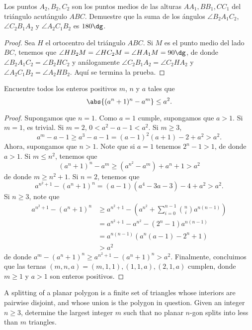 \begin{probEG}
	Los puntos $A_2,B_2,C_2$ son los puntos medios de las alturas $AA_1,BB_1,CC_1$ del triángulo acutángulo $ABC$. Demuestre que la suma de los ángulos $\angle B_2A_1C_2$, $\angle C_2B_1A_2$ y $\angle A_2C_1B_2$ es $180\dg$.
\end{probEG}

\begin{proof}
	Sea $H$ el ortocentro del triángulo $ABC$. Si $M$ es el punto medio del lado $BC$, tenemos que $\angle HB_2M=\angle HC_2M=\angle HA_1M=90\dg$, de donde $\angle B_2A_1C_2=\angle B_2HC_2$ y análogamente $\angle C_2B_1A_2=\angle C_2HA_2$ y $\angle A_2C_1B_2=\angle A_2HB_2$. Aquí se termina la prueba.
\end{proof}

\begin{probMB}
	Encuentre todos los enteros positivos $m$, $n$ y $a$ tales que
	\[\abs{(a^n+1)^n-a^m}\le a^2.\]
\end{probMB}

\begin{proof}
	Supongamos que $n=1$. Como $a=1$ cumple, supongamos que $a>1$. Si $m=1$, es trivial. Si $m=2$, $0<a^2-a-1<a^2$. Si $m\ge 3$,
	\[a^m-a-1\ge a^3-a-1=(a-1)^2(a+1)-2+a^2>a^2.\]
	Ahora, supongamos que $n>1$. Note que si $a=1$ tenemos $2^n-1>1$, de donde $a>1$. Si $m\le n^2$, tenemos que
	\[(a^n+1)^n-a^m\ge \left(a^{n^2}-a^m\right)+a^n+1>a^2\]
	de donde $m\ge n^2+1$. Si $n=2$, tenemos que
	\[a^{n^2+1}-(a^n+1)^n=(a-1)(a^4-3a-3)-4+a^2>a^2.\]
	Si $n\ge 3$, note que
	\begin{align*}
		a^{n^2+1}-(a^n+1)^n
		&\ge a^{n^2+1}-\left(a^{n^2}+\sum_{i=0}^{n-1}\binom{n}{i}a^{n(n-1)}\right)\\
		&=a^{n^2+1}-a^{n^2}-(2^n-1)a^{n(n-1)}\\
		&=a^{n(n-1)}\left(a^n(a-1)-2^n+1\right)\\
		&>a^2
	\end{align*}
	de donde $a^m-(a^n+1)^n\ge a^{n^2+1}-(a^n+1)^n>a^2$. Finalmente, concluimos que las ternas $(m,n,a)=(m,1,1),(1,1,a),(2,1,a)$ cumplen, donde $m\ge 1$ y $a>1$ son enteros positivos.
\end{proof}

\note[Miscelánea]{}

\begin{probEG}
	A splitting of a planar polygon is a finite set of triangles whose interiors are pairwise disjoint, and whose union is the polygon in question. Given an integer $n\ge 3$, determine the largest integer $m$ such that no planar $n$-gon splits into less than $m$ triangles.
\end{probEG}

